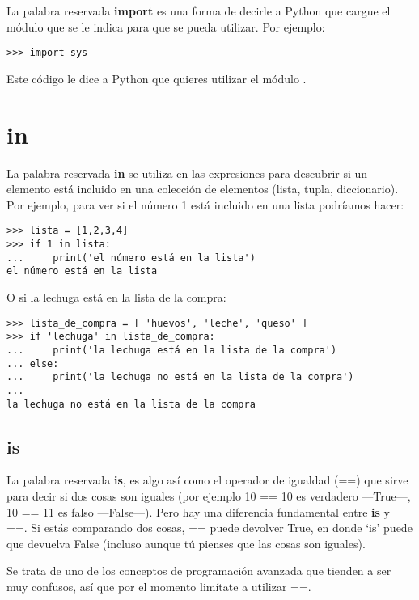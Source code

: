 La palabra reservada \textbf{import} es una forma de decirle a Python que cargue el módulo que se le indica para que se pueda utilizar. Por ejemplo:

\begin{listing}
\begin{verbatim}
>>> import sys
\end{verbatim}
\end{listing}

Este código le dice a Python que quieres utilizar el módulo .

\section*{in}

La palabra reservada \textbf{in} se utiliza en las expresiones para descubrir si un elemento está incluido en una colección de elementos (lista, tupla, diccionario). Por ejemplo, para ver si el número 1 está incluido en una lista podríamos hacer:

\begin{listing}
\begin{verbatim}
>>> lista = [1,2,3,4]
>>> if 1 in lista:
...     print('el número está en la lista')
el número está en la lista
\end{verbatim}
\end{listing}

\noindent
O si la lechuga está en la lista de la compra:

\begin{listing}
\begin{verbatim}
>>> lista_de_compra = [ 'huevos', 'leche', 'queso' ]
>>> if 'lechuga' in lista_de_compra:
...     print('la lechuga está en la lista de la compra')
... else:
...     print('la lechuga no está en la lista de la compra')
...
la lechuga no está en la lista de la compra
\end{verbatim}
\end{listing}

\subsection*{is}

La palabra reservada \textbf{is}, es algo así como el operador de igualdad (==) que sirve para decir si dos cosas son iguales (por ejemplo 10 == 10 es verdadero ---True---, 10 == 11 es falso ---False---).  Pero hay una diferencia fundamental entre \textbf{is} y ==. Si estás comparando dos cosas, == puede devolver True, en donde `is' puede que devuelva False (incluso aunque tú pienses que las cosas son iguales).
\par
Se trata de uno de los conceptos de programación avanzada que tienden a ser muy confusos, así que por el momento limítate a utilizar ==.

